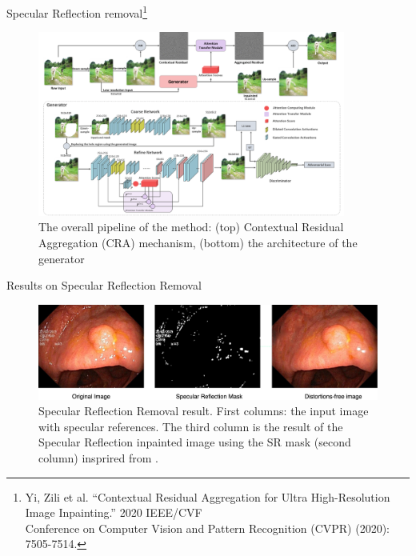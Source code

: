 \documentclass{libs/ufc_format}
\begin{document}
\begin{frame}{\small Specular Reflection removal\footnote[frame]{\tiny Yi, Zili et al. “Contextual Residual Aggregation for Ultra High-Resolution Image Inpainting.” 2020 IEEE/CVF \\ Conference on Computer Vision and Pattern Recognition (CVPR) (2020): 7505-7514.}}

    \begin{figure}
        \centering
        \includegraphics[width=0.9\textwidth]{libs/srover.png}
        \caption{The overall pipeline of the method: (top) Contextual Residual Aggregation (CRA) mechanism, (bottom) the architecture of the generator \cite{Yi2020ContextualRA}}
        \label{uneven_illumination_correction}
    \end{figure}
\end{frame}
\begin{frame}{\small Results on Specular Reflection Removal}

    \begin{figure}
        \centering
        \includegraphics[width=1\textwidth]{libs/srres3.png}
        \caption{Specular Reflection Removal result. First columns: the input image with specular references. The third column is the result of the Specular Reflection inpainted image using the SR mask (second column) insprired from \cite{yi2020contextual}.}
    \end{figure}
\end{frame}
\end{document}
